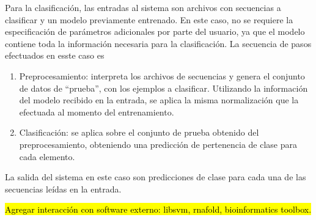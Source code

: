 Para la clasificación, las entradas al sistema son archivos con
secuencias a clasificar y un modelo previamente entrenado.  En este
caso, no se requiere la especificación de parámetros adicionales por
parte del usuario, ya que el modelo contiene toda la información
necesaria para la clasificación.  La secuencia de pasos efectuados en
esste caso es
%
\begin{enumerate}
\item Preprocesamiento: interpreta los archivos de secuencias y
  genera el conjunto de datos de ``prueba'', con los ejemplos a
  clasificar. Utilizando la información del modelo recibido en la
  entrada, se aplica la misma normalización que la efectuada al
  momento del entrenamiento.
\item Clasificación: se aplica sobre el conjunto de prueba obtenido
  del preprocesamiento, obteniendo una predicción de pertenencia de
  clase para cada elemento.
\end{enumerate}
%
La salida del sistema en este caso son predicciones de clase para cada
una de las secuencias leídas en la entrada.

\hl{Agregar interacción con software externo: libsvm, rnafold,
  bioinformatics toolbox.}
